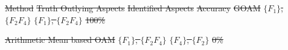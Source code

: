 \documentclass[
 size=14pt,
 paper=smartboard,  %
 mode=present, 		%
 display=slides, 	%
 style=tuliplab,  	%
 pauseslide,
 fleqn,leqno]{powerdot}
\providecommand{\DIFdeltex}[1]{{\protect\color{red}\sout{#1}}}                      %
\providecommand{\DIFdelFL}[1]{\DIFdel{#1}} %
\providecommand{\DIFdelbeginFL}{} %
\providecommand{\DIFdelendFL}{} %
\providecommand{\DIFdel}[1]{\texorpdfstring{\DIFdeltex{#1}}{}} %
\newcommand{\DIFscaledelfig}{0.5}
\newlength{\DIFdelgraphicswidth} %
\newlength{\DIFdelgraphicsheight} %
\newcommand{\DIFdelincludegraphics}[2][]{%
\sbox{\DIFdelgraphicsbox}{\DIFOincludegraphics[#1]{#2}}%
\settoboxwidth{\DIFdelgraphicswidth}{\DIFdelgraphicsbox} %
\settoboxtotalheight{\DIFdelgraphicsheight}{\DIFdelgraphicsbox} %
\scalebox{\DIFscaledelfig}{%
\parbox[b]{\DIFdelgraphicswidth}{\usebox{\DIFdelgraphicsbox}\\[-\baselineskip] \rule{\DIFdelgraphicswidth}{0em}}\llap{\resizebox{\DIFdelgraphicswidth}{\DIFdelgraphicsheight}{%
\setlength{\unitlength}{\DIFdelgraphicswidth}%
\begin{picture}(1,1)%
\thicklines\linethickness{2pt} %
{\color[rgb]{1,0,0}\put(0,0){\framebox(1,1){}}}%
{\color[rgb]{1,0,0}\put(0,0){\line( 1,1){1}}}%
{\color[rgb]{1,0,0}\put(0,1){\line(1,-1){1}}}%
\end{picture}%
}\hspace*{3pt}}} %
} %
\DeclareRobustCommand{\DIFdelbeginFL}{\DIFOdelbeginFL \let\includegraphics\DIFdelincludegraphics} %
\DeclareRobustCommand{\DIFdelendFL}{\DIFOaddendFL \let\includegraphics\DIFOincludegraphics} %
\begin{document}
\DIFdelbeginFL %
  \DIFdelFL{Method     }%
\DIFdelFL{Truth Outlying Aspects    }%
\DIFdelFL{Identified Aspects }%
\DIFdelFL{Accuracy      }%
\DIFdelFL{GOAM       }%
\DIFdelFL{$\{F_1\}$, $\{F_2F_4\}$   }%
\DIFdelFL{$\{F_1\}$, $\{F_2F_4\}$    }%
\DIFdelFL{100\%    }%
\DIFdelendFL %

\DIFdelbeginFL \DIFdelFL{Arithmetic Mean based OAM }%
\DIFdelFL{$\{F_1\}$, $\{F_2F_4\}$   }%
\DIFdelFL{$\{F_4\}$, $\{F_2\}$    }%
\DIFdelFL{0\% }%
\DIFdelendFL %
\end{document}

